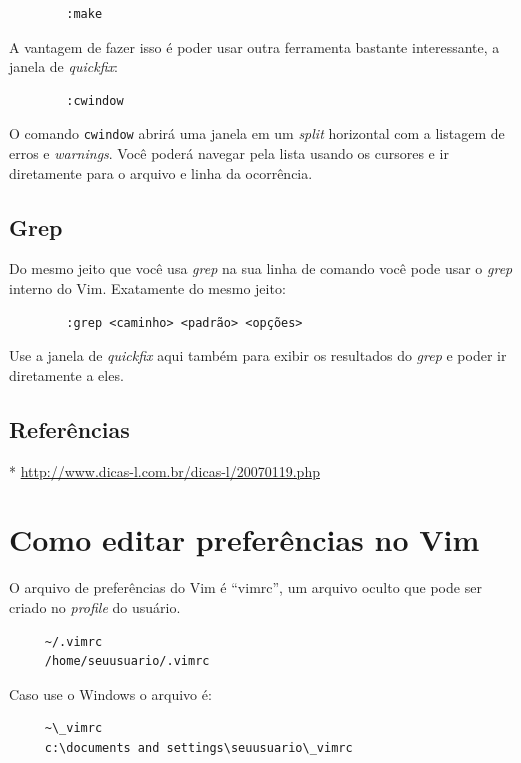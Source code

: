 \documentclass[10pt,a4paper,openany]{book}
\begin{document}
\begin{verbatim}
		:make
\end{verbatim}

A vantagem de fazer isso é poder usar outra ferramenta bastante interessante, a janela
de {\em quickfix}:

\begin{verbatim}
		:cwindow
\end{verbatim}

O comando {\tt cwindow} abrirá uma janela em um {\em split} horizontal com a
listagem de erros e {\em warnings}.  Você poderá navegar pela lista usando os
cursores e ir diretamente para o arquivo e linha da ocorrência.

\section{Grep}

Do mesmo jeito que você usa {\em grep} na sua linha de comando você pode usar
o {\em grep} interno do Vim. Exatamente do mesmo jeito:

\begin{verbatim}
		:grep <caminho> <padrão> <opções>
\end{verbatim}

Use a janela de {\em quickfix} aqui também para exibir os resultados do {\em
grep} e poder ir diretamente 
a eles.

\section{Referências}
* \url{http://www.dicas-l.com.br/dicas-l/20070119.php}

\chapter{Como editar preferências no Vim}\label{cha:Como editar preferências no Vim}
O arquivo de preferências do Vim é ``vimrc'', um arquivo oculto que
pode ser criado no {\em profile} do usuário.

\begin{verbatim}
     ~/.vimrc
     /home/seuusuario/.vimrc
\end{verbatim}

Caso use o Windows o arquivo é:

\begin{verbatim}
     ~\_vimrc
     c:\documents and settings\seuusuario\_vimrc
\end{verbatim}
\end{document}
